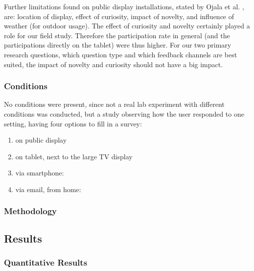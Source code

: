 	Further limitations found on public display installations, stated by Ojala et al. \cite{Ojala2011}, are: location of display, effect of curiosity, impact of novelty, and influence of weather (for outdoor usage). The effect of curiosity and novelty certainly played a role for our field study. Therefore the participation rate in general (and the participations directly on the tablet) were thus higher. For our two primary research questions, which question type and which feedback channels are best suited, the impact of novelty and curiosity should not have a big impact.


	\subsubsection{Conditions}

	No conditions were present, since not a real lab experiment with different conditions was conducted, but a study observing how the user responded to one setting, having four options to fill in a survey:

		\begin{enumerate}
		\item on public display
		\item on tablet, next to the large TV display
		\item via smartphone: 
		\item via email, from home:
		\end{enumerate}


	\subsubsection{Methodology}






\subsection{Results}


\subsubsection{Quantitative Results}




